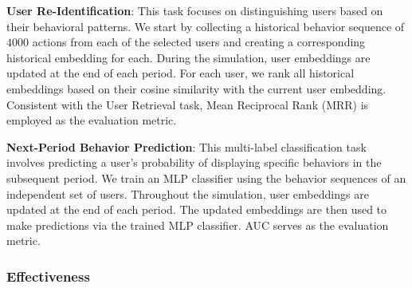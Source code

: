 \documentclass{article}
\begin{document}
\textbf{User Re-Identification}: This task focuses on distinguishing users based on their behavioral patterns. We start by collecting a historical behavior sequence of $4000$ actions from each of the 
selected users and creating a corresponding historical embedding for each. During the simulation, user embeddings are updated at the end of each period. For each user, we rank all historical embeddings based on their cosine similarity with the current user embedding. Consistent with the User Retrieval task, Mean Reciprocal Rank (MRR) is employed as the evaluation metric.

\textbf{Next-Period Behavior Prediction}: This multi-label classification task involves predicting a user's probability of displaying specific behaviors in the subsequent period. We train an MLP classifier using the behavior sequences of an independent set of 
users. Throughout the simulation, user embeddings are updated at the end of each period. The updated embeddings are then used to make predictions via the trained MLP classifier. AUC serves as the evaluation metric.


\subsubsection{Effectiveness}

\end{document}
